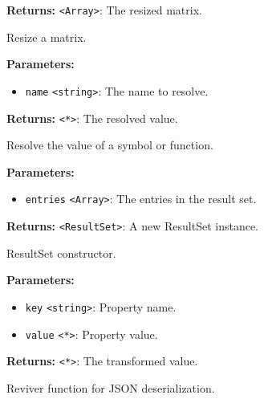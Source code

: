 \documentclass[12pt,a4paper]{article}
\begin{document}
\noindent \textbf{Returns:} \texttt{<Array>}: The resized matrix.

\noindent Resize a matrix.

\vspace{5mm}
\noindent {}


\noindent \textbf{Parameters:}
\begin{itemize}
  \item \texttt{name} \texttt{<string>}: The name to resolve.
\end{itemize}

\noindent \textbf{Returns:} \texttt{<*>}: The resolved value.

\noindent Resolve the value of a symbol or function.

\vspace{5mm}
\noindent {}


\noindent \textbf{Parameters:}
\begin{itemize}
  \item \texttt{entries} \texttt{<Array>}: The entries in the result set.
\end{itemize}

\noindent \textbf{Returns:} \texttt{<ResultSet>}: A new ResultSet instance.

\noindent ResultSet constructor.

\vspace{5mm}
\noindent {}


\noindent \textbf{Parameters:}
\begin{itemize}
  \item \texttt{key} \texttt{<string>}: Property name.
  \item \texttt{value} \texttt{<*>}: Property value.
\end{itemize}

\noindent \textbf{Returns:} \texttt{<*>}: The transformed value.

\noindent Reviver function for JSON deserialization.

\vspace{5mm}
\noindent {}
\end{document}
